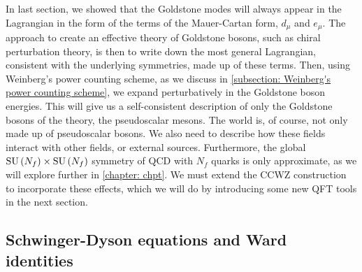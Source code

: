 In last section, we showed that the Goldstone modes will always appear in the Lagrangian in the form of the terms of the Mauer-Cartan form, $d_\mu$ and $e_\mu$.
The approach to create an effective theory of Goldstone bosons, such as chiral perturbation theory, is then to write down the most general Lagrangian, consistent with the underlying symmetries, made up of these terms.
Then, using Weinberg's power counting scheme, as we discuss in \autoref{subsection: Weinberg's power counting scheme}, we expand perturbatively in the Goldstone boson energies.
This will give us a self-consistent description of only the Goldstone bosons of the theory, the pseudoscalar mesons.
The world is, of course, not only made up of pseudoscalar bosons.
We also need to describe how these fields interact with other fields, or external sources.
Furthermore, the global $\text{SU}\left(N_f\right)\times\text{SU}\left(N_f\right)$ symmetry of QCD with $N_f$ quarks is only approximate, as we will explore further in \autoref{chapter: chpt}.
We must extend the CCWZ construction to incorporate these effects, which we will do by introducing some new QFT tools in the next section.



\subsection{Schwinger-Dyson equations and Ward identities}


